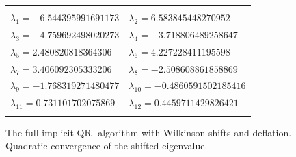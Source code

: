 \documentclass[a4paper,8pt]{beamer} %
\begin{document}
\begin{frame}
\begin{columns}
\begin{figure}
\begin{center}
	\begin{scriptsize}
	\begin{tabular}{ll}
		\hline
		\hline
		\\
		$\lambda_1=
		-6.544395991691173
		$ & $\lambda_2=
		6.583845448270952
		$ \\ $\lambda_3=
		-4.759692498020273
		$ & $\lambda_4=
		-3.718806489258647
		$ \\ $\lambda_5=
		2.480820818364306
		$ & $\lambda_6=
		4.227228411195598
		$ \\ $\lambda_7=
		3.406092305333206
		$ & $\lambda_8=
		-2.508608861858869
		$ \\ $\lambda_9=
		-1.768319271480477
		$ & $\lambda_{10}=
		-0.4860591502185416
		$ \\ $\lambda_{11}=
		0.731101702075869
		$ & $\lambda_{12}=
		0.4459711429826421
		$ \\
		\\
		\hline
		\hline
	\end{tabular}
	\end{scriptsize}
\caption{
	The full implicit QR- algorithm with Wilkinson shifts and deflation. Quadratic convergence
	of the shifted eigenvalue. 
}
\end{center}
\end{figure}
%
%
%
\end{columns}
\end{frame}%
\end{document}
